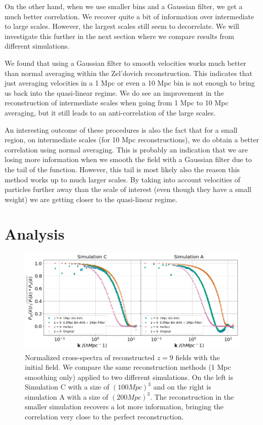 On the other hand, when we use smaller bins and a Gaussian filter, we get a much better correlation. We recover quite a bit of information over intermediate to large scales. However, the largest scales still seem to decorrelate. We will investigate this further in the next section where we compare results from different simulations. 

We found that using a Gaussian filter to smooth velocities works much better than normal averaging within the Zel'dovich reconstruction. This indicates that just averaging velocities in a 1 Mpc or even a 10 Mpc bin is not enough to bring us back into the quasi-linear regime. We do see an improvement in the reconstruction of intermediate scales when going from 1 Mpc to 10 Mpc averaging, but it still leads to an anti-correlation of the large scales.

An interesting outcome of these procedures is also the fact that for a small region, on intermediate scales (for 10 Mpc reconstructions), we do obtain a better correlation using normal averaging. This is probably an indication that we are losing more information when we smooth the field with a Gaussian filter due to the tail of the function. However, this tail is most likely also the reason this method works up to much larger scales. By taking into account velocities of particles further away than the scale of interest (even though they have a small weight) we are getting closer to the quasi-linear regime. 

\section{Analysis}

\begin{figure}
    \centering
    \includegraphics[width=1\columnwidth]{images/realRecon/z9SimComp.png}%
    
    \caption{
        Normalized cross-spectra of reconstructed $z=9$ fields with the initial field. We compare the same reconstruction methods (1 Mpc smoothing only) applied to two different simulations. On the left is Simulation C with a size of $(100 Mpc)^3$ and on the right is simulation A with a size of $(200 Mpc)^3$. The reconstruction in the smaller simulation recovers a lot more information, bringing the correlation very close to the perfect reconstruction.
        }
        
        \label{fig:4.4}
    \end{figure}
    
